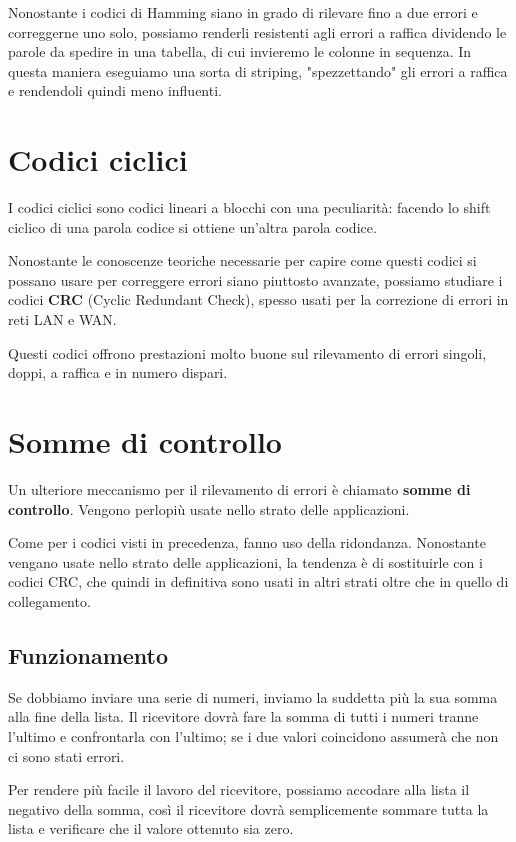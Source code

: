             Nonostante i codici di Hamming siano in grado di rilevare fino a due errori e correggerne uno solo, possiamo renderli resistenti agli errori a raffica dividendo le parole da spedire in una tabella, di cui invieremo le colonne in sequenza. In questa maniera eseguiamo una sorta di striping, "spezzettando" gli errori a raffica e rendendoli quindi meno influenti.
    
\section{Codici ciclici}
    I codici ciclici sono codici lineari a blocchi con una peculiarità: facendo lo shift ciclico di una parola codice si ottiene un'altra parola codice.
    
    Nonostante le conoscenze teoriche necessarie per capire come questi codici si possano usare per correggere errori siano piuttosto avanzate, possiamo studiare i codici \textbf{CRC} (Cyclic Redundant Check), spesso usati per la correzione di errori in reti LAN e WAN.
    
    Questi codici offrono prestazioni molto buone sul rilevamento di errori singoli, doppi, a raffica e in numero dispari.
    
\section{Somme di controllo}
    Un ulteriore meccanismo per il rilevamento di errori è chiamato \textbf{somme di controllo}. Vengono perlopiù usate nello strato delle applicazioni.
    
    Come per i codici visti in precedenza, fanno uso della ridondanza. Nonostante vengano usate nello strato delle applicazioni, la tendenza è di sostituirle con i codici CRC, che quindi in definitiva sono usati in altri strati oltre che in quello di collegamento.
    
    \subsection{Funzionamento}
        Se dobbiamo inviare una serie di numeri, inviamo la suddetta più la sua somma alla fine della lista. Il ricevitore dovrà fare la somma di tutti i numeri tranne l'ultimo e confrontarla con l'ultimo; se i due valori coincidono assumerà che non ci sono stati errori.
        
        Per rendere più facile il lavoro del ricevitore, possiamo accodare alla lista il negativo della somma, così il ricevitore dovrà semplicemente sommare tutta la lista e verificare che il valore ottenuto sia zero.
        
